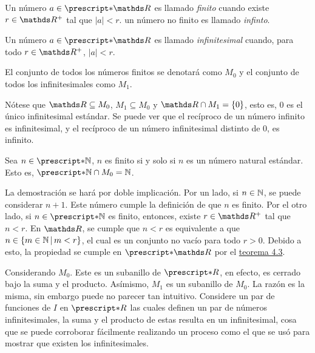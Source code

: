 \begin{definition}
  Un número $a\in\st{\R}$ es llamado \emph{finito} cuando existe
  $r\in\R^+$ tal que $|a| < r$. un número no finito es llamado
  \emph{infinto}.

  Un número $a\in\st{\R}$ es llamado \emph{infinitesimal} cuando, para
  todo $r\in\R^+$, $|a|<r$.

  El conjunto de todos los números finitos se denotará como $M_0$ y el
  conjunto de todos los infinitesimales como $M_1$.
\end{definition}

Nótese que $\R\subseteq M_0$, $M_1\subseteq M_0$ y $\R \cap M_1 = \{0\}$,
esto es, $0$ es el único infinitesimal estándar. Se puede ver que el
recíproco de un número infinito es infinitesimal, y el recíproco de
un número infinitesimal distinto de $0$, es infinito.

\begin{theorem}
  Sea $n\in\st{\N}$, $n$ es finito si y solo si $n$ es un número natural
  estándar. Esto es, $\st{\N} \cap M_0 = \N$.
\end{theorem}

\begin{demo}
  La demostración se hará por doble implicación. Por un lado, si
  $n\in\mathbb{N}$, se puede considerar $n+1$. Este número cumple la definición
  de que $n$ es finito. Por el otro lado, si $n\in\st{\N}$ es finito,
  entonces, existe $r\in\R^+$ tal que $n<r$. En $\R$, se cumple que
  $n<r$ es equivalente a que $n\in\left\{m\in\mathbb{N}\,\middle|\,m<r\right\}$, el cual es un
  conjunto no vacío para todo $r>0$. Debido a esto, la propiedad
  se cumple en $\st{\R}$ por el \hyperref[theo:FT]{teorema 4.3}.
\end{demo}

Considerando $M_0$. Este es un subanillo de $\st{R}$, en efecto, es
cerrado bajo la suma y el producto. Asímismo, $M_1$ es un subanillo de
$M_0$. La razón es la misma, sin embargo puede no parecer tan intuitivo.
Considere un par de funciones de $I$ en $\st{R}$ las cuales definen un
par de números infinitesimales, la suma y el producto de estas resulta
en un infinitesimal, cosa que se puede corroborar fácilmente realizando
un proceso como el que se usó para mostrar que existen los
infinitesimales.

